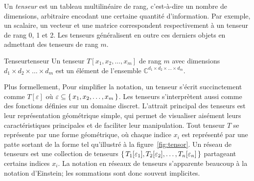 Un \textit{tenseur} est un tableau multilinéaire de rang, c'est-à-dire un nombre de dimensions, arbitraire encodant une certaine quantité d'information. Par exemple, un scalaire, un vecteur et une matrice correspondent respectivement à un tenseur de rang 0, 1 et 2. Les tenseurs généralisent en outre ces derniers objets en admettant des tenseurs de rang $m$. 

\begin{maindefinition}{Tenseur}{tenseur}
    Un tenseur $T[x_{1}, x_{2}, \dots, x_{m}]$ de rang $m$ avec dimensions $d_{1} \times d_{2} \times \dots \times d_{m}$ est un élément de l'ensemble $\mathbb{C}^{d_{1} \times d_{2} \times \dots \times d_{m}}$.
\end{maindefinition}

Plus formellement,  Pour simplifier la notation, un tenseur s'écrit succinctement comme $T[\varepsilon]$ où $\varepsilon \subseteq \set{ x_{1}, x_{2}, \dots, x_{m} }$. Les tenseurs s'interprètent aussi comme des fonctions définies sur un domaine discret. L'attrait principal des tenseurs est leur représentation géométrique simple, qui permet de visualiser aisément leurs caractéristiques principales et de faciliter leur manipulation. Tout tenseur $T$ se représente par une forme géométrique, où chaque indice $x_{i}$ est représenté par une patte sortant de la forme tel qu'illustré à la figure~\ref{fig:tensor}. Un réseau de tenseurs est une collection de tenseurs $\set{ T_{1}[\varepsilon_{1}], T_{2}[\varepsilon_{2}], \dots, T_{n}[\varepsilon_{n}] }$ partageant certains indices $x_{i}$. La notation en réseaux de tenseurs s'apparente beaucoup à la notation d'Einstein; les sommations sont donc souvent implicites. 


